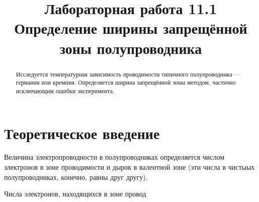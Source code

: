 \documentclass[a4paper]{article}
\title{Лабораторная работа 11.1\\
Определение ширины запрещённой зоны полупроводника}
\begin{document}
	\maketitle
	\begin{abstract}
	Исследуется температурная зависимость проводимости
	типичного полупроводника --- германия или кремния.
	Определяется ширина запрещённой зоны методом, частично
	исключающим ошибки эксперимента.
	\end{abstract}
	\section{Теоретическое введение}
Величина электропроводности в полупроводниках определяется
числом электронов в зоне проводимости и дырок в валентной зоне
(эти числа в чистыых полупроводниках, конечно, равны друг другу).

Числа электронов, находящихся в зоне провод
\end{document}
